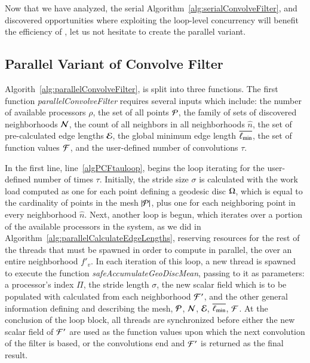 Now that we have analyzed, the serial Algorithm~\ref{alg:serialConvolveFilter}, and discovered opportunities where exploiting the loop-level concurrency will benefit the efficiency of , let us not hesitate to create the parallel variant.

%
%
\subsection{Parallel Variant of Convolve Filter}
\label{ch6sCFPssPRCN}
Algorith~\ref{alg:parallelConvolveFilter}, is split into three functions. The first function \textit{parallelConvolveFilter} requires several inputs which include: the number of available processors $\rho$, the set of all points $\mathcal{P}$, the family of sets of discovered neighborhoods $\mathcal{N}$, the count of all neighbors in all neighborhoods $\hat{n}$, the set of pre-calculated edge lengths $\mathcal{E}$, the global minimum edge length $\overline{\ell_\text{min}}$, the set of function values $\mathcal{F}$, and the user-defined number of convolutions $\tau$.

In the first line, line~\ref{algPCFtauloop}, begins the loop iterating for the user-defined number of times $\tau$. Initially, the stride size $\sigma$ is calculated with the work load computed as one for each point defining a geodesic disc $\Omega$, which is equal to the cardinality of points in the mesh $|\mathcal{P}|$, plus one for each neighboring point in every neighborhood $\hat{n}$. Next, another loop is begun, which iterates over a portion of the available processors in the system, as we did in Algorithm~\ref{alg:parallelCalculateEdgeLengths}, reserving resources for the rest of the threads that must be spawned in order to compute in parallel, the \wmfv{} over an entire neighborhood $f'_v$. In each iteration of this loop, a new thread is spawned to execute the function \textit{safeAccumulateGeoDiscMean}, passing to it as parameters: a processor's index $\Pi$, the stride length $\sigma$, the new scalar field which is to be populated with calculated  from each neighborhood $\mathcal{F}'$, and the other general information defining and describing the mesh, $\mathcal{P}$, $\mathcal{N}$, $\mathcal{E}$, $\overline{\ell_\text{min}}$, $\mathcal{F}$. At the conclusion of the loop block, all threads are synchronized before either the new scalar field of  $\mathcal{F}'$ are used as the function values upon which the next convolution of the filter is based, or the convolutions end and $\mathcal{F}'$ is returned as the final result.

